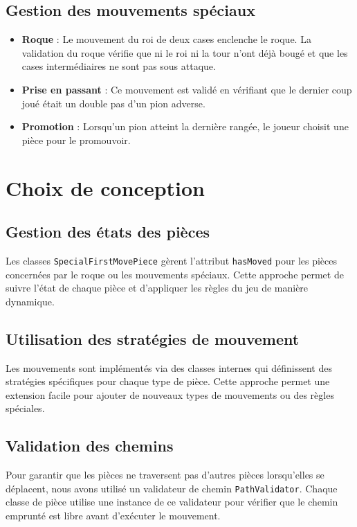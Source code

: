 \documentclass[12pt]{report}
\begin{document}
    \subsection*{Gestion des mouvements spéciaux}
    \begin{itemize}
        \item \textbf{Roque} : Le mouvement du roi de deux cases enclenche le roque. La validation du roque vérifie que ni le roi ni la tour n'ont déjà bougé et que les cases intermédiaires ne sont pas sous attaque.
        \item \textbf{Prise en passant} : Ce mouvement est validé en vérifiant que le dernier coup joué était un double pas d'un pion adverse.
        \item \textbf{Promotion} : Lorsqu'un pion atteint la dernière rangée, le joueur choisit une pièce pour le promouvoir.
    \end{itemize}



    \section*{Choix de conception}
    \subsection*{Gestion des états des pièces}
    Les classes \texttt{SpecialFirstMovePiece} gèrent l'attribut \texttt{hasMoved} pour les pièces concernées par le roque ou les mouvements spéciaux. Cette approche permet de suivre l'état de chaque pièce et d'appliquer les règles du jeu de manière dynamique.

    \subsection*{Utilisation des stratégies de mouvement}
    Les mouvements sont implémentés via des classes internes qui définissent des stratégies spécifiques pour chaque type de pièce. Cette approche permet une extension facile pour ajouter de nouveaux types de mouvements ou des règles spéciales.

    \subsection*{Validation des chemins}
    Pour garantir que les pièces ne traversent pas d'autres pièces lorsqu'elles se déplacent, nous avons utilisé un validateur de chemin \texttt{PathValidator}. Chaque classe de pièce utilise une instance de ce validateur pour vérifier que le chemin emprunté est libre avant d'exécuter le mouvement.
\end{document}
